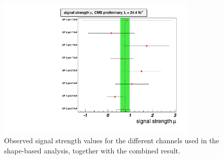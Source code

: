 \begin{figure}[hbt]
\begin{center}
\includegraphics[width=0.85\textwidth]{figures/mu_allchannels.pdf}
\caption{\label{fig:mu_allchannels} Observed signal strength values for the 
different channels used in the shape-based analysis, together with the 
combined result.}
\end{center}
\end{figure}
